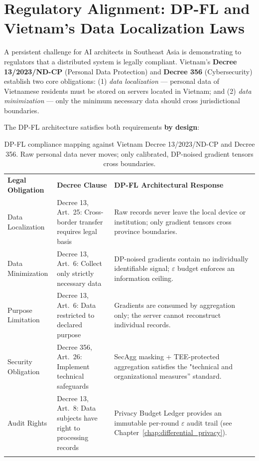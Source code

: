 \section{Regulatory Alignment: DP-FL and Vietnam's Data Localization Laws}
\label{sec:fl_regulatory}

A persistent challenge for AI architects in Southeast Asia is demonstrating to regulators that a distributed system is legally compliant. Vietnam's \textbf{Decree 13/2023/ND-CP} (Personal Data Protection) and \textbf{Decree 356} (Cybersecurity) establish two core obligations: (1) \emph{data localization} — personal data of Vietnamese residents must be stored on servers located in Vietnam; and (2) \emph{data minimization} — only the minimum necessary data should cross jurisdictional boundaries.

The DP-FL architecture satisfies both requirements \textbf{by design}:

\begin{table}[ht]
\centering
\caption{DP-FL compliance mapping against Vietnam Decree 13/2023/ND-CP and Decree 356. Raw personal data never moves; only calibrated, DP-noised gradient tensors cross boundaries.}
\label{tab:fl_decree_mapping}
\renewcommand{\arraystretch}{1.3}
\begin{tabular}{p{3.2cm} p{3.8cm} p{4.8cm}}
\hline\noalign{\smallskip}
\textbf{Legal Obligation} & \textbf{Decree Clause} & \textbf{DP-FL Architectural Response} \\
\noalign{\smallskip}\svhline\noalign{\smallskip}
Data Localization & Decree 13, Art.\ 25: Cross-border transfer requires legal basis & Raw records never leave the local device or institution; only gradient tensors cross province boundaries. \\[3pt]
Data Minimization & Decree 13, Art.\ 6: Collect only strictly necessary data & DP-noised gradients contain no individually identifiable signal; $\varepsilon$ budget enforces an information ceiling. \\[3pt]
Purpose Limitation & Decree 13, Art.\ 6: Data restricted to declared purpose & Gradients are consumed by aggregation only; the server cannot reconstruct individual records. \\[3pt]
Security Obligation & Decree 356, Art.\ 26: Implement technical safeguards & SecAgg masking + TEE-protected aggregation satisfies the "technical and organizational measures'' standard. \\[3pt]
Audit Rights & Decree 13, Art.\ 8: Data subjects have right to processing records & Privacy Budget Ledger provides an immutable per-round $\varepsilon$ audit trail (see Chapter~\ref{chap:differential_privacy}). \\
\noalign{\smallskip}\hline\noalign{\smallskip}
\end{tabular}
\end{table}

